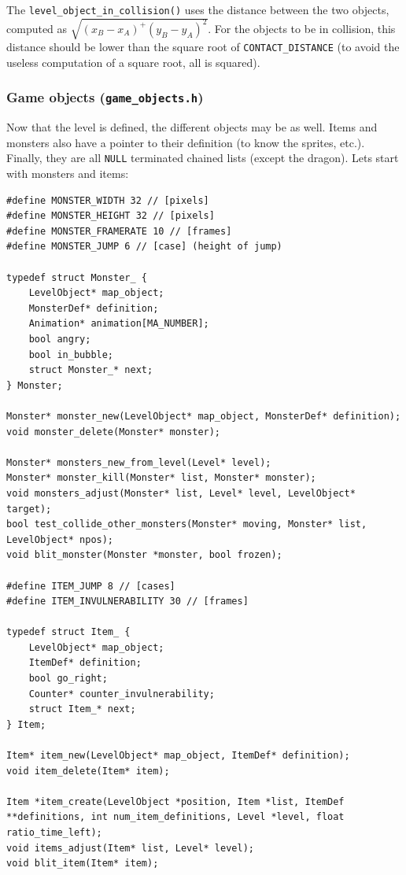 \documentclass[12pt,a4paper]{article}
\newcommand{\cc}[1]{\texttt{#1}}
\begin{document}
The \cc{level_object_in_collision()} uses the distance between the two objects, computed as $\sqrt{(x_B-x_A)^+(y_B-y_A)^2}$. For the objects to be in collision, this distance should be lower than the square root of \cc{CONTACT_DISTANCE} (to avoid the useless computation of a square root, all is squared).

\subsubsection{Game objects (\texttt{game\_objects.h})}

Now that the level is defined, the different objects may be as well. Items and monsters also have a pointer to their definition (to know the sprites, etc.). Finally, they are all \cc{NULL} terminated chained lists (except the dragon). Lets start with monsters and items:

\begin{verbatim}
#define MONSTER_WIDTH 32 // [pixels]
#define MONSTER_HEIGHT 32 // [pixels]
#define MONSTER_FRAMERATE 10 // [frames]
#define MONSTER_JUMP 6 // [case] (height of jump)

typedef struct Monster_ {
    LevelObject* map_object;
    MonsterDef* definition;
    Animation* animation[MA_NUMBER];
    bool angry;
    bool in_bubble;
    struct Monster_* next;
} Monster;

Monster* monster_new(LevelObject* map_object, MonsterDef* definition);
void monster_delete(Monster* monster);

Monster* monsters_new_from_level(Level* level);
Monster* monster_kill(Monster* list, Monster* monster);
void monsters_adjust(Monster* list, Level* level, LevelObject* target);
bool test_collide_other_monsters(Monster* moving, Monster* list, LevelObject* npos);
void blit_monster(Monster *monster, bool frozen);

#define ITEM_JUMP 8 // [cases]
#define ITEM_INVULNERABILITY 30 // [frames]

typedef struct Item_ {
    LevelObject* map_object;
    ItemDef* definition;
    bool go_right;
    Counter* counter_invulnerability;
    struct Item_* next;
} Item;

Item* item_new(LevelObject* map_object, ItemDef* definition);
void item_delete(Item* item);

Item *item_create(LevelObject *position, Item *list, ItemDef **definitions, int num_item_definitions, Level *level, float ratio_time_left);
void items_adjust(Item* list, Level* level);
void blit_item(Item* item);
\end{verbatim}
\end{document}
